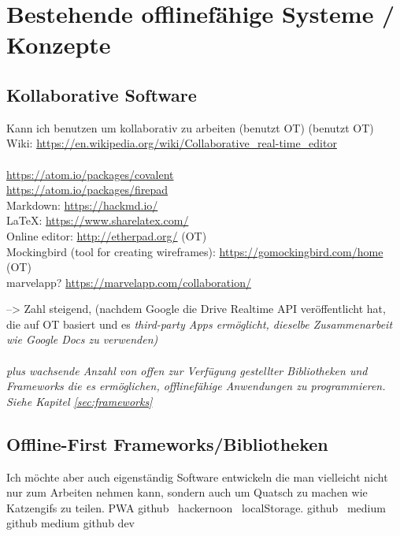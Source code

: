\chapter{\label{chap:state}Bestehende offlinefähige Systeme / Konzepte}
%
%
\section{Kollaborative Software}
Kann ich benutzen um kollaborativ zu arbeiten
(benutzt OT)
(benutzt OT)
Wiki: \url{https://en.wikipedia.org/wiki/Collaborative_real-time_editor}\\\\
\url{https://atom.io/packages/covalent}\\
\url{https://atom.io/packages/firepad}\\
Markdown: \url{https://hackmd.io/}\\
LaTeX: \url{https://www.sharelatex.com/}\\
Online editor: \url{http://etherpad.org/} (OT)\\
Mockingbird (tool for creating wireframes): \url{https://gomockingbird.com/home} (OT)\\
marvelapp? \url{https://marvelapp.com/collaboration/}

--> Zahl steigend, (nachdem Google die Drive Realtime API veröffentlicht hat, die auf \gls{OT} basiert und es \it{third-party Apps} ermöglicht, dieselbe Zusammenarbeit wie Google Docs zu verwenden)\\\\
\b{plus} wachsende Anzahl von offen zur Verfügung gestellter Bibliotheken und Frameworks die es ermöglichen, offlinefähige Anwendungen zu programmieren. Siehe Kapitel \ref{sec:frameworks}
%
%
\section{\label{sec:frameworks}Offline-First Frameworks/Bibliotheken}
Ich möchte aber auch eigenständig Software entwickeln die man vielleicht nicht nur zum Arbeiten nehmen kann, sondern auch um Quatsch zu machen wie Katzengifs zu teilen.
\Gls{PWA}
%
%
%
%
\cite{realm}
%
%
github~\cite{redux-offline-gh}
hackernoon~\cite{redux-offline}
%
%
localStorage. github~\cite{redux-persist-gh} medium~\cite{redux-persist}
%
%
github \cite{rn-offline-gh} medium\cite{rn-offline-medium}
%
%
github\cite{webpack-gh}
dev\cite{webpack-dev}
%
%
\cite{hoodie}